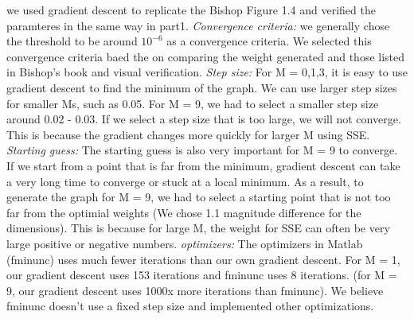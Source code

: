 we used gradient descent to replicate 
the Bishop Figure 1.4 and verified the paramteres in the same way in part1. 
\textit{Convergence criteria:} we generally chose the threshold to be around $10^{-6}$ as a convergence criteria. We selected this convergence criteria baed the on comparing the weight generated and those listed in Bishop's book and visual verification. 
\textit{Step size:} For M = 0,1,3, it is easy to use gradient descent to find the minimum of the graph. We can use larger step sizes for smaller Ms, such as 0.05. For M = 9, we had to select a smaller step size around 0.02 - 0.03. If we select a step size that is too large, we will not converge. This is because the gradient changes more quickly for larger M using SSE.
\textit{Starting guess:} The starting guess is also very important for M = 9 to converge. If we start from a point that is far from the minimum, gradient descent can take a very long time to converge or stuck at a local minimum. As a result, to generate the graph for M = 9, we had to select a starting point that is not too far from the optimial weights (We chose 1.1 magnitude difference for the dimensions). This is because for large M, the weight for SSE can often be very large positive or negative numbers. 
\textit{optimizers:} The optimizers in Matlab (fminunc) uses much fewer iterations than our own gradient descent. For M = 1, our gradient descent uses 153 iterations and fminunc uses 8 iterations. (for M = 9, our gradient descent uses 1000x more iterations than fminunc). We believe fminunc doesn't use a fixed step size and implemented other optimizations. 
